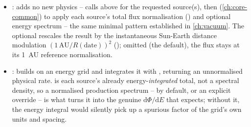 \begin{implbox}
\begin{itemize}
  \item {}: adds no new physics -- calls
     above for the requested source(s),
    then  (\cref{ch:core-common}) to
    apply each source's total flux normalisation ()
    and optional energy spectrum -- the same minimal pattern established in
    \cref{ch:vacuum}. The optional  rescales the result by the
    instantaneous Sun-Earth distance modulation
    $(1\,\mathrm{AU}/R(\text{date}))^2$
    (); omitted
    (the default), the flux stays at its 1~AU reference normalisation.
  \item {}: builds
     on an energy grid and integrates it with
    , returning an unnormalised
    physical rate.  is each source's already
    energy-\emph{integrated} total, not a spectral density, so a normalised
    production spectrum --  by default, or an
    explicit  override -- is what turns it into the
    genuine $\mathrm{d}\Phi/\mathrm{d}E$ that 
    expects; without it, the energy integral would silently pick up a
    spurious factor of the grid's own units and spacing.
\end{itemize}
\end{implbox}
